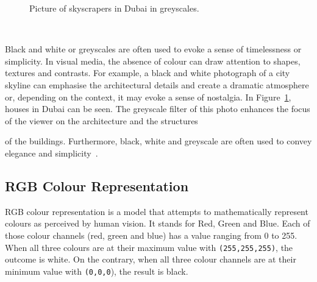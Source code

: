 \documentclass[../MasterThesis.tex]{subfiles}
\begin{document}
\begin{minipage}{0.5\textwidth}
	\begin{figure}[H]
	\begin{center}
		\caption[Picture of skyscrapers in Dubai in greyscales.]{Picture of skyscrapers in Dubai in greyscales.}
		\label{figure:gray}
	\end{center}
\end{figure}\hfill
\end{minipage}\begin{minipage}{0.05\textwidth}
	\ 
\end{minipage}\begin{minipage}{0.45\textwidth}
	Black and white or greyscales are often used to evoke a sense of timelessness or simplicity. In visual media, the absence of colour can draw attention to shapes, textures and contrasts. For example, a black and white photograph of a city skyline can emphasise the architectural details and create a dramatic atmosphere or, depending on the context, it may evoke a sense of nostalgia.
	In Figure~\ref{figure:gray}, houses in Dubai can be seen. The greyscale filter of this photo enhances the focus of the viewer on the architecture and the structures

	
\end{minipage}

\vspace*{-0.2em}
 of the buildings. Furthermore, black, white and greyscale are often used to convey elegance and simplicity~\cite{colour2}.


%



\subsection{RGB Colour Representation}
\label{subsection:RGB}


RGB colour representation is a model that attempts to mathematically represent colours as perceived by human vision. It stands for Red, Green and Blue. 
Each of those colour channels (red, green and blue) has a value ranging from 0 to 255. When all three colours are at their maximum value with \texttt{(255,255,255)}, the outcome is white. On the contrary, when all three colour channels are at their minimum value with \texttt{(0,0,0}), the result is black.
\end{document}
